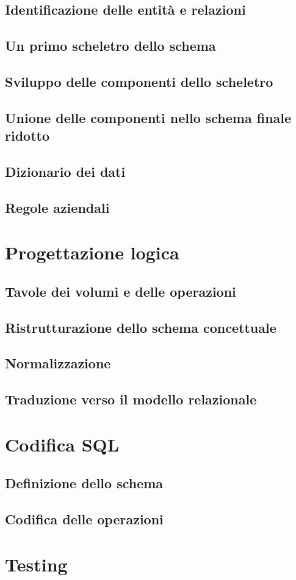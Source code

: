 \documentclass{article}
\begin{document}
\subsection{Identificazione delle entità e relazioni}

\subsection{Un primo scheletro dello schema}

\subsection{Sviluppo delle componenti dello scheletro}

\subsection{Unione delle componenti nello schema finale ridotto}

\subsection{Dizionario dei dati}

\subsection{Regole aziendali}

\section{Progettazione logica}

\subsection{Tavole dei volumi e delle operazioni}

\subsection{Ristrutturazione dello schema concettuale}

\subsection{Normalizzazione}

\subsection{Traduzione verso il modello relazionale}

\section{Codifica SQL}

\subsection{Definizione dello schema}

\subsection{Codifica delle operazioni}

\section{Testing}
\end{document}
